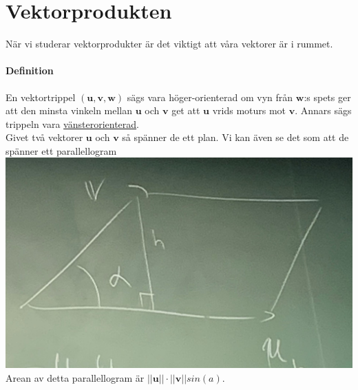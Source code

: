    \section{Vektorprodukten}
    När vi studerar vektorprodukter är det viktigt att våra vektorer är i rummet.

    \paragraph{Definition} En vektortrippel $(\bm{u}, \bm{v}, \bm{w})$ sägs vara höger-orienterad om vyn från $\bm{w}$:s spets ger att den minsta vinkeln mellan $\bm{u}$ och $\bm{v}$ get att $\bm{u}$ vrids moturs mot $\bm{v}$.
    Annars sägs trippeln vara \underline{vänsterorienterad}.
    \\
    Givet två vektorer $\bm{u}$ och $\bm{v}$ så spänner de ett plan. Vi kan även se det som att de spänner ett parallellogram\\
    \includegraphics[scale=0.12]{imgs/22-01-20-img08.jpg}
    \\Arean av detta parallellogram är $||\bm{u}||\cdot||\bm{v}||sin(a)$.



